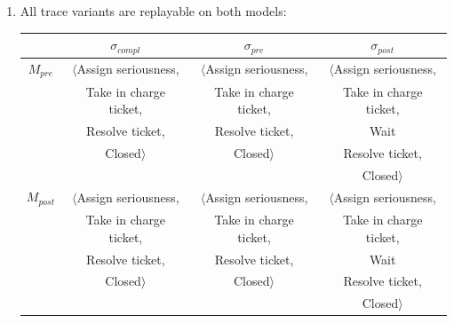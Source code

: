 \documentclass[../../main.tex]{subfiles}
\begin{document}
\begin{enumerate}
\item All trace variants are replayable on both models:\\
\begin{tabular}{c | c c c}
    & $\sigma_{compl}$ & $\sigma_{pre}$ & $\sigma_{post}$ \\
    \hline
    $M_{pre}$ & $\langle$Assign seriousness, & $\langle$Assign seriousness, & $\langle$Assign seriousness, \\
    & Take in charge ticket, & Take in charge ticket, & Take in charge ticket, \\
    & Resolve ticket, & Resolve ticket, & Wait \\
    & Closed$\rangle$ & Closed$\rangle$ & Resolve ticket, \\
    & & & Closed$\rangle$ \\
    $M_{post}$ & $\langle$Assign seriousness, & $\langle$Assign seriousness, & $\langle$Assign seriousness, \\
    & Take in charge ticket, & Take in charge ticket, & Take in charge ticket, \\
    & Resolve ticket, & Resolve ticket, & Wait \\
    & Closed$\rangle$ & Closed$\rangle$ & Resolve ticket, \\
    & & & Closed$\rangle$ \\
\end{tabular}
\end{enumerate}
\end{document}
